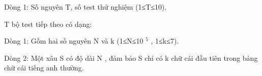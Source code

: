 Dòng 1: Số nguyên T, số test thử nghiệm (1≤T≤10).  

   T bộ test tiếp theo có dạng:  

   Dòng 1: Gồm hai số nguyên N và k (1≤N≤10   $^    5   $   , 1≤k≤7).  

   Dòng 2: Một xâu S có độ dài N , đảm bảo S chỉ có k chữ cái đầu tiên trong bảng chữ cái tiếng anh thường.  

\